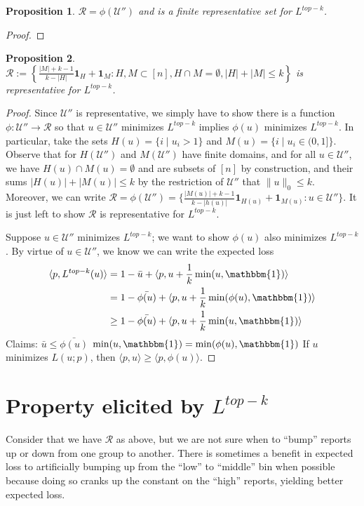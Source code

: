 \documentclass[12pt]{article}
\newcommand{\R}{\mathcal{R}}
\newcommand{\U}{\mathcal{U}}
\newcommand{\inprod}[2]{\langle #1, #2 \rangle}%
\newcommand{\ones}{\mathbbm{1}}
\newtheorem{proposition}{Proposition}
\begin{document}
\begin{proposition}
	$\R = \phi(\U'')$ and is a finite representative set for $L^{top-k}$.
\end{proposition}
\begin{proof}
	
\end{proof}

\begin{proposition}
	$\R := \left\{ \frac{|M| + k -1}{k - |H|} \mathbf{1}_H + \mathbf{1}_M : H, M \subset [n], H\cap M = \emptyset, |H| + |M| \leq k \right\}$ is representative for $L^{top-k}$.
\end{proposition}
\begin{proof}
	Since $\U''$ is representative, we simply have to show there is a function $\phi : \U'' \to \R$ so that $u \in \U''$ minimizes $L^{top-k}$ implies $\phi(u)$ minimizes $L^{top-k}$.
	In particular, take the sets $H(u) = \{i \mid u_i > 1\}$ and $M(u) = \{i \mid u_i \in (0,1]\}$.
	Observe that for $H(\U'')$ and $M(\U'')$ have finite domains, and for all $u \in \U''$, we have $H(u) \cap M(u) = \emptyset$ and are subsets of $[n]$ by construction, and their sums $|H(u)| + |M(u)| \leq k$ by the restriction of $\U''$ that $\|u\|_0 \leq k$.
	Moreover, we can write $\R = \phi(\U'') = \{\frac{|M(u)| + k -1}{k - |h(u)|} \mathbf{1}_{H(u)} + \mathbf{1}_{M(u)} : u \in \U''\}$.
	It is just left to show $\R$ is representative for $L^{top-k}$.
	
	Suppose $u \in \U''$ minimizes $L^{top-k}$; we want to show $\phi(u)$ also minimizes $L^{top-k}$.
	By virtue of $u \in \U''$, we know we can write the expected loss 
	\begin{align*}
	\inprod{p}{L^{top-k}(u)} &= 1 - \bar u + \inprod{p}{u + \frac 1 k \min(u,\ones)}\\
	&= 1 - \bar{\phi(u)} + \inprod{p}{u + \frac 1 k \min(\phi(u),\ones)}\\
	&\geq 1 - \bar{\phi(u)} + \inprod{p}{u + \frac 1 k \min(u,\ones)}\\
	\end{align*}
	Claims: $\bar u \leq \bar{\phi(u)}$
	$\min(u, \ones) = \min(\phi(u), \ones)$
	If $u$ minimizes $L(u;p)$, then $\inprod{p}{u} \geq \inprod{p}{\phi(u)}$.
\end{proof}


\section{Property elicited by $L^{top-k}$}
Consider that we have $\R$ as above, but we are not sure when to ``bump'' reports up or down from one group to another.
There is sometimes a benefit in expected loss to artificially bumping up from the ``low'' to ``middle'' bin when possible because doing so cranks up the constant on the ``high'' reports, yielding better expected loss.
\end{document}
